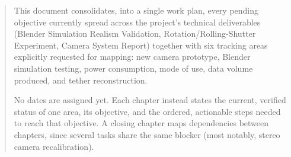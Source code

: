 \documentclass[a4paper, twoside]{report}
\begin{document}


\begin{abstract}
This document consolidates, into a single work plan, every pending objective currently spread across the project's technical deliverables (Blender Simulation Realism Validation, Rotation/Rolling-Shutter Experiment, Camera System Report) together with six tracking areas explicitly requested for mapping: new camera prototype, Blender simulation testing, power consumption, mode of use, data volume produced, and tether reconstruction.

No dates are assigned yet. Each chapter instead states the current, verified status of one area, its objective, and the ordered, actionable steps needed to reach that objective. A closing chapter maps dependencies between chapters, since several tasks share the same blocker (most notably, stereo camera recalibration).
\end{abstract}

\tableofcontents
\listoffigures
\listoftables











\end{document}
